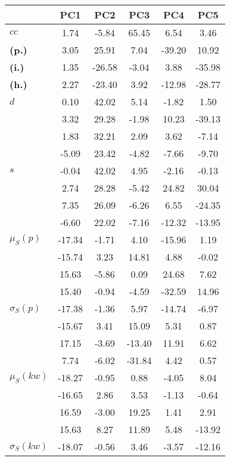 \begin{table}[h!]
\begin{center}
\begin{tabular}{| l || c | c | c | c | c |}\hline
 & {\bf PC1} & {\bf PC2} & {\bf PC3} & {\bf PC4} & {\bf PC5} \\\hline\hline
{\bf $cc$} & 1.74 & -5.84 & 65.45 & 6.54 & 3.46 \\
{\bf (p.)} & 3.05 & 25.91 & 7.04 & -39.20 & 10.92 \\
{\bf (i.)} & 1.35 & -26.58 & -3.04 & 3.88 & -35.98 \\
{\bf (h.)} & 2.27 & -23.40 & 3.92 & -12.98 & -28.77 \\\hline
{\bf $d$} & 0.10 & 42.02 & 5.14 & -1.82 & 1.50 \\
{\bf } & 3.32 & 29.28 & -1.98 & 10.23 & -39.13 \\
{\bf } & 1.83 & 32.21 & 2.09 & 3.62 & -7.14 \\
{\bf } & -5.09 & 23.42 & -4.82 & -7.66 & -9.70 \\\hline
{\bf $s$} & -0.04 & 42.02 & 4.95 & -2.16 & -0.13 \\
{\bf } & 2.74 & 28.28 & -5.42 & 24.82 & 30.04 \\
 & 7.35  & 26.09  & -6.26  & 6.55  & -24.35 \\
 & -6.60  & 22.02  & -7.16  & -12.32  & -13.95 \\\hline
$\mu_S(p)$ & -17.34  & -1.71  & 4.10  & -15.96  & 1.19 \\
 & -15.74  & 3.23  & 14.81  & 4.88  & -0.02 \\
 & 15.63  & -5.86  & 0.09  & 24.68  & 7.62 \\
 & 15.40  & -0.94  & -4.59  & -32.59  & 14.96 \\\hline
$\sigma_S(p)$ & -17.38  & -1.36  & 5.97  & -14.74  & -6.97 \\
 & -15.67  & 3.41  & 15.09  & 5.31  & 0.87 \\
 & 17.15  & -3.69  & -13.40  & 11.91  & 6.62 \\
 & 7.74  & -6.02  & -31.84  & 4.42  & 0.57 \\\hline
$\mu_S(kw)$ & -18.27  & -0.95  & 0.88  & -4.05  & 8.04 \\
 & -16.65  & 2.86  & 3.53  & -1.13  & -0.64 \\
 & 16.59  & -3.00  & 19.25  & 1.41  & 2.91 \\
 & 15.63  & 8.27  & 11.89  & 5.48  & -13.92 \\\hline
$\sigma_S(kw)$ & -18.07  & -0.56  & 3.46  & -3.57  & -12.16 \\

\end{tabular}
\end{center}
\end{table}

